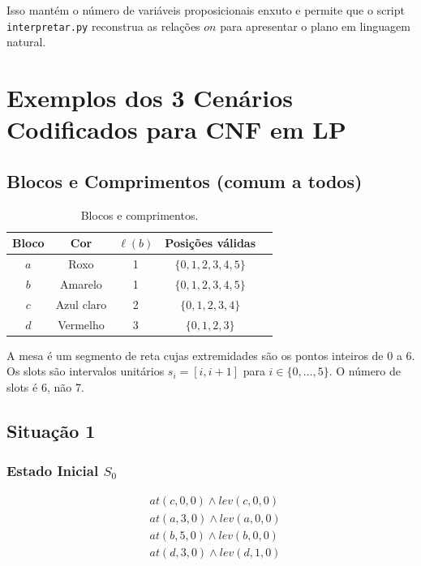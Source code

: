 \documentclass[12pt,a4paper]{article}
\begin{document}
Isso mantém o número de variáveis proposicionais enxuto e permite que o script \texttt{interpretar.py} reconstrua as relações $on$ para apresentar o plano em linguagem natural.

\section{Exemplos dos 3 Cenários Codificados para CNF em LP}
\label{sec:cenarios}

\subsection{Blocos e Comprimentos (comum a todos)}

\begin{table}[h!]
\centering
\begin{tabular}{@{}ccccc@{}}
\toprule
\textbf{Bloco} & \textbf{Cor} & $\ell(b)$ & \textbf{Posições válidas} \\
\midrule
$a$ & Roxo & 1 & $\{0,1,2,3,4,5\}$ \\
$b$ & Amarelo & 1 & $\{0,1,2,3,4,5\}$ \\
$c$ & Azul claro & 2 & $\{0,1,2,3,4\}$ \\
$d$ & Vermelho & 3 & $\{0,1,2,3\}$ \\
\bottomrule
\end{tabular}
\caption{Blocos e comprimentos.}
\end{table}

A mesa é um segmento de reta cujas extremidades são os pontos inteiros de $0$ a $6$. Os slots são intervalos unitários $s_i = [i, i+1]$ para $i \in \{0,\dots,5\}$. O número de slots é 6, não 7.

\subsection{Situação 1}

\subsubsection{Estado Inicial $S_0$}

\[
\begin{aligned}
&at(c, 0, 0) \wedge lev(c, 0, 0) \\
&at(a, 3, 0) \wedge lev(a, 0, 0) \\
&at(b, 5, 0) \wedge lev(b, 0, 0) \\
&at(d, 3, 0) \wedge lev(d, 1, 0)
\end{aligned}
\]
\end{document}
